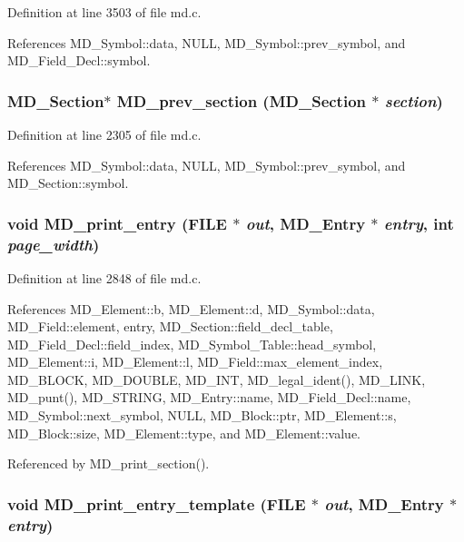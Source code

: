 Definition at line 3503 of file md.c.

References MD\_\-Symbol::data, NULL, MD\_\-Symbol::prev\_\-symbol, and MD\_\-Field\_\-Decl::symbol.
\subsubsection{\setlength{\rightskip}{0pt plus 5cm}\bf{MD\_\-Section}$\ast$ MD\_\-prev\_\-section (\bf{MD\_\-Section} $\ast$ {\em section})}\label{md_8h_63f1cd43f3bfeb9a85ccbfeeebdd5b04}




Definition at line 2305 of file md.c.

References MD\_\-Symbol::data, NULL, MD\_\-Symbol::prev\_\-symbol, and MD\_\-Section::symbol.
\subsubsection{\setlength{\rightskip}{0pt plus 5cm}void MD\_\-print\_\-entry (FILE $\ast$ {\em out}, \bf{MD\_\-Entry} $\ast$ {\em entry}, int {\em page\_\-width})}\label{md_8h_abcdd59628e0ae0a22502255751bdc72}




Definition at line 2848 of file md.c.

References MD\_\-Element::b, MD\_\-Element::d, MD\_\-Symbol::data, MD\_\-Field::element, entry, MD\_\-Section::field\_\-decl\_\-table, MD\_\-Field\_\-Decl::field\_\-index, MD\_\-Symbol\_\-Table::head\_\-symbol, MD\_\-Element::i, MD\_\-Element::l, MD\_\-Field::max\_\-element\_\-index, MD\_\-BLOCK, MD\_\-DOUBLE, MD\_\-INT, MD\_\-legal\_\-ident(), MD\_\-LINK, MD\_\-punt(), MD\_\-STRING, MD\_\-Entry::name, MD\_\-Field\_\-Decl::name, MD\_\-Symbol::next\_\-symbol, NULL, MD\_\-Block::ptr, MD\_\-Element::s, MD\_\-Block::size, MD\_\-Element::type, and MD\_\-Element::value.

Referenced by MD\_\-print\_\-section().
\subsubsection{\setlength{\rightskip}{0pt plus 5cm}void MD\_\-print\_\-entry\_\-template (FILE $\ast$ {\em out}, \bf{MD\_\-Entry} $\ast$ {\em entry})}\label{md_8h_fa54d4b65e66f3155ce7a585a76e7244}




